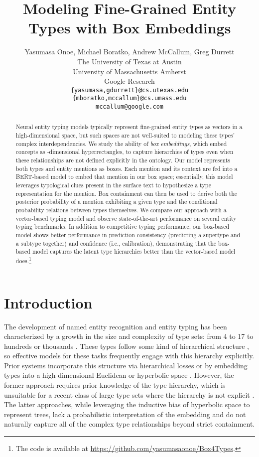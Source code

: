 \documentclass[11pt,a4paper]{article}
\title{Modeling Fine-Grained Entity Types with Box Embeddings}
\author{
Yasumasa Onoe,
Michael Boratko,
Andrew McCallum,
Greg Durrett\\
The University of Texas at Austin \\
University of Massachusetts Amherst \\
Google Research\\
{\tt\{yasumasa,gdurrett\}@cs.utexas.edu} \\{\tt \{mboratko,mccallum\}@cs.umass.edu} \\{\tt mccallum@google.com}}
\date{}
\begin{document}
\setlength{\abovedisplayskip}{2pt}
\setlength{\belowdisplayskip}{2pt}

\maketitle
\begin{abstract}
Neural entity typing models typically represent fine-grained entity types as vectors in a high-dimensional space, but such spaces are not well-suited to modeling these types' complex interdependencies. We study the ability of \emph{box embeddings}, which embed concepts as -dimensional hyperrectangles, to capture hierarchies of types even when these relationships are not defined explicitly in the ontology. Our model represents both types and entity mentions as boxes. Each mention and its context are fed into a BERT-based model to embed that mention in our box space; essentially, this model leverages typological clues present in the surface text to hypothesize a type representation for the mention. Box containment can then be used to derive both the posterior probability of a mention exhibiting a given type and the conditional probability relations between types themselves. We compare our approach with a vector-based typing model and observe state-of-the-art performance on several entity typing benchmarks. In addition to competitive typing performance, our box-based model shows better performance in prediction consistency (predicting a supertype and a subtype together) and confidence (i.e., calibration), demonstrating that the box-based model captures the latent type hierarchies better than the vector-based model does.\footnote{The code is available at \url{https://github.com/yasumasaonoe/Box4Types}.} 
\end{abstract}

\section{Introduction}\label{sec:intro}
The development of named entity recognition and entity typing has been characterized by a growth in the size and complexity of type sets: from 4 \citep{conll_03} to 17 \citep{Eduard_Hovy_06} to hundreds \cite{bbn, Xiao_Ling_12} or thousands \cite{Eunsol_Choi_18}. These types follow some kind of hierarchical structure \citep{bbn, Xiao_Ling_12, Dan_Gillick_14, Shikhar_Murty_18}, so effective models for these tasks frequently engage with this hierarchy explicitly. Prior systems incorporate this structure via hierarchical losses \cite{Shikhar_Murty_18, Peng_Xu_18, Tongfei_Chen_20} or by embedding types into a high-dimensional Euclidean or hyperbolic space \citep{Dani_Yogatama_15,  Federico_Lopez_20}. However, the former approach requires prior knowledge of the type hierarchy, which is unsuitable for a recent class of large type sets where the hierarchy is not explicit \cite{Eunsol_Choi_18,Yasumasa_Onoe_20}. The latter approaches, while leveraging the inductive bias of hyperbolic space to represent trees, lack a probabilistic interpretation of the embedding and do not naturally capture all of the complex type relationships beyond strict containment. 
\end{document}
